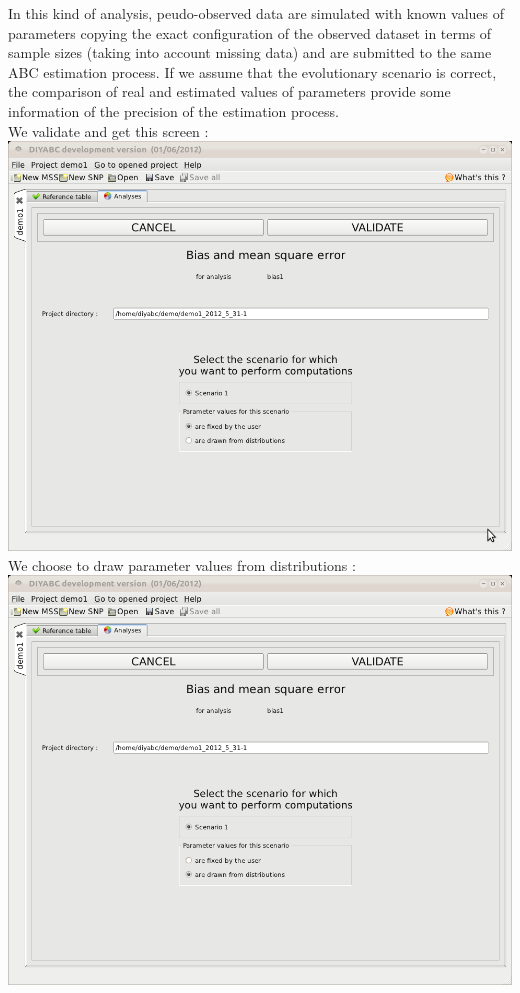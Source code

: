 In this kind of analysis, peudo-observed data are simulated with known values of parameters copying the exact configuration of the observed dataset in terms of sample sizes (taking into account missing data) and are submitted to the same ABC estimation process. If we assume that the evolutionary scenario is correct, the comparison of real and estimated values of parameters provide some information of the precision of the estimation process.\\  
We validate and get this screen :\\

\includegraphics[scale=0.35]{gui_pictures/Capture-DIYABC-44.png} \\

We choose to draw parameter values from distributions :\\

\includegraphics[scale=0.35]{gui_pictures/Capture-DIYABC-45.png} \\

